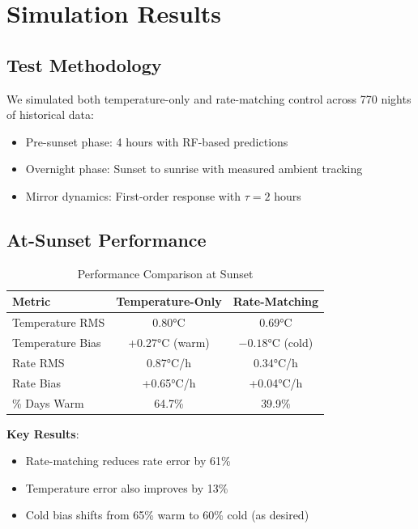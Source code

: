 \documentclass[11pt,letterpaper]{article}
\begin{document}
\section{Simulation Results}

\subsection{Test Methodology}

We simulated both temperature-only and rate-matching control across 770 nights of historical data:
\begin{itemize}
    \item Pre-sunset phase: 4 hours with RF-based predictions
    \item Overnight phase: Sunset to sunrise with measured ambient tracking
    \item Mirror dynamics: First-order response with $\tau = 2$ hours
\end{itemize}

\subsection{At-Sunset Performance}

\begin{table}[H]
\centering
\caption{Performance Comparison at Sunset}
\label{tab:sunset}
\begin{tabular}{l|cc}
\toprule
\textbf{Metric} & \textbf{Temperature-Only} & \textbf{Rate-Matching} \\
\midrule
Temperature RMS & 0.80°C & 0.69°C \\
Temperature Bias & +0.27°C (warm) & $-0.18$°C (cold) \\
Rate RMS & 0.87°C/h & 0.34°C/h \\
Rate Bias & +0.65°C/h & +0.04°C/h \\
\% Days Warm & 64.7\% & 39.9\% \\
\bottomrule
\end{tabular}
\end{table}

\textbf{Key Results}:
\begin{itemize}
    \item Rate-matching reduces rate error by 61\%
    \item Temperature error also improves by 13\%
    \item Cold bias shifts from 65\% warm to 60\% cold (as desired)
\end{itemize}
\end{document}
